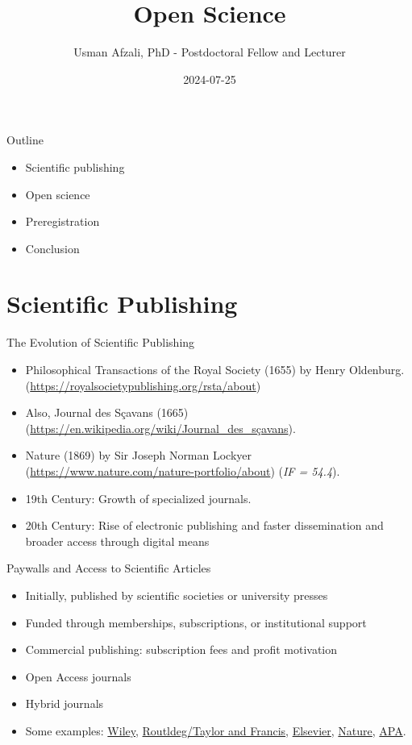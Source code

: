 \documentclass[
  ignorenonframetext,
  aspectratio=169,
]{beamer}
\title{Open Science}
\author{Usman Afzali, PhD - Postdoctoral Fellow and Lecturer}
\date{2024-07-25}
\institute{University of Canterbury}
\providecommand{\tightlist}{%
  \setlength{\itemsep}{0pt}\setlength{\parskip}{0pt}}\usepackage{longtable,booktabs,array}
\begin{document}
\frame{\titlepage}

\begin{frame}{Outline}
\label{outline}
\begin{itemize}
\tightlist
\item
  Scientific publishing
\item
  Open science
\item
  Preregistration
\item
  Conclusion
\end{itemize}
\end{frame}

\section{Scientific Publishing}\label{scientific-publishing}

\begin{frame}{The Evolution of Scientific Publishing}
\label{the-evolution-of-scientific-publishing}
\begin{itemize}[<+->]
\tightlist
\item
  Philosophical Transactions of the Royal Society (1655) by Henry
  Oldenburg. (\url{https://royalsocietypublishing.org/rsta/about})
\item
  Also, Journal des Sçavans (1665)
  (\url{https://en.wikipedia.org/wiki/Journal_des_sçavans}).
\item
  Nature (1869) by Sir Joseph Norman Lockyer
  (\url{https://www.nature.com/nature-portfolio/about}) (\emph{IF =
  54.4}).
\item
  19th Century: Growth of specialized journals.
\item
  20th Century: Rise of electronic publishing and faster dissemination
  and broader access through digital means
\end{itemize}
\end{frame}

\begin{frame}{Paywalls and Access to Scientific Articles}
\label{paywalls-and-access-to-scientific-articles}
\begin{itemize}[<+->]
\tightlist
\item
  Initially, published by scientific societies or university presses
\item
  Funded through memberships, subscriptions, or institutional support
\item
  Commercial publishing: subscription fees and profit motivation
\item
  Open Access journals
\item
  Hybrid journals
\item
  Some examples: \href{https://onlinelibrary.wiley.com}{Wiley},
  \href{https://www.taylorfrancis.com}{Routldeg/Taylor and Francis},
  \href{https://www.elsevier.com/products/sciencedirect/journals}{Elsevier},
  \href{https://www.nature.com/nature/journal-impact}{Nature},
  \href{https://www.apa.org/pubs/journals}{APA}.
\end{itemize}
\end{frame}
\end{document}
